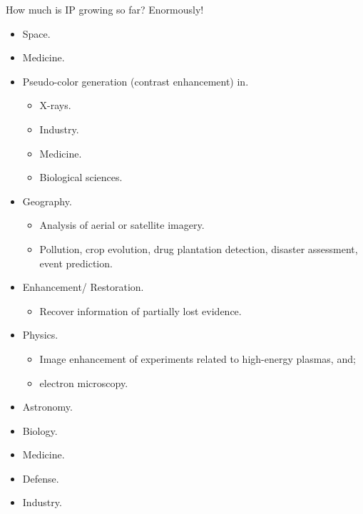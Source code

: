
\begin{frame}
How much is IP growing so far? Enormously!
\begin{itemize}
\item Space.
\item Medicine.
\item Pseudo-color generation (contrast enhancement) in.
\begin{itemize}
\item X-rays.
\item Industry.
\item Medicine.
\item Biological sciences.
\end{itemize}
\end{itemize}
\end{frame}


\begin{frame}
\begin{itemize}
\item Geography.
\begin{itemize}
\item Analysis of aerial or satellite imagery.
\item Pollution, crop evolution, drug plantation detection, disaster assessment, event prediction.
\end{itemize}
\item Enhancement/ Restoration.
\begin{itemize}
\item Recover information of partially lost evidence.
\end{itemize}
\item Physics.
\begin{itemize}
\item Image enhancement of experiments related to high-energy plasmas, and;
\item electron microscopy.
\end{itemize}
\end{itemize}
\end{frame}


\begin{frame}
\begin{itemize}
\item Astronomy.
\item Biology.
\item Medicine.
\item Defense.
\item Industry.
\end{itemize}
\end{frame}


